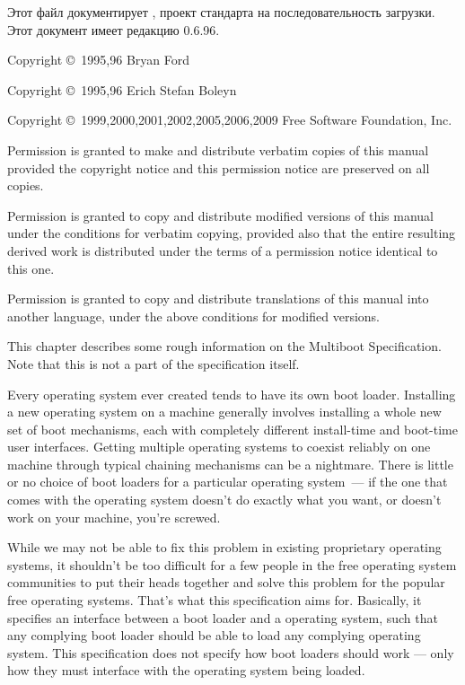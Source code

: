 \bigskip

Этот файл документирует , проект стандарта на последовательность загрузки.
Этот документ имеет редакцию 0.6.96.

Copyright \copyright\ 1995,96 Bryan Ford 

Copyright \copyright\ 1995,96 Erich Stefan Boleyn 

Copyright \copyright\ 1999,2000,2001,2002,2005,2006,2009 
Free Software Foundation, Inc.

Permission is granted to make and distribute verbatim copies of this manual
provided the copyright notice and this permission notice are preserved on all
copies.

Permission is granted to copy and distribute modified versions of this manual
under the conditions for verbatim copying, provided also that the entire
resulting derived work is distributed under the terms of a permission notice
identical to this one.

Permission is granted to copy and distribute translations of this manual into
another language, under the above conditions for modified versions.

\secdown

This chapter describes some rough information on the Multiboot Specification.
Note that this is not a part of the specification itself.


Every operating system ever created tends to have its own boot loader.
Installing a new operating system on a machine generally involves installing a
whole new set of boot mechanisms, each with completely different install-time
and boot-time user interfaces. Getting multiple operating systems to coexist
reliably on one machine through typical chaining mechanisms can be a nightmare.
There is little or no choice of boot loaders for a particular operating system\
--- if the one that comes with the operating system doesn't do exactly what you
want, or doesn't work on your machine, you're screwed.

While we may not be able to fix this problem in existing proprietary operating
systems, it shouldn't be too difficult for a few people in the free operating
system communities to put their heads together and solve this problem for the
popular free operating systems. That's what this specification aims for.
Basically, it specifies an interface between a boot loader and a operating
system, such that any complying boot loader should be able to load any complying
operating system. This specification does not specify how boot loaders should
work — only how they must interface with the operating system being loaded.


